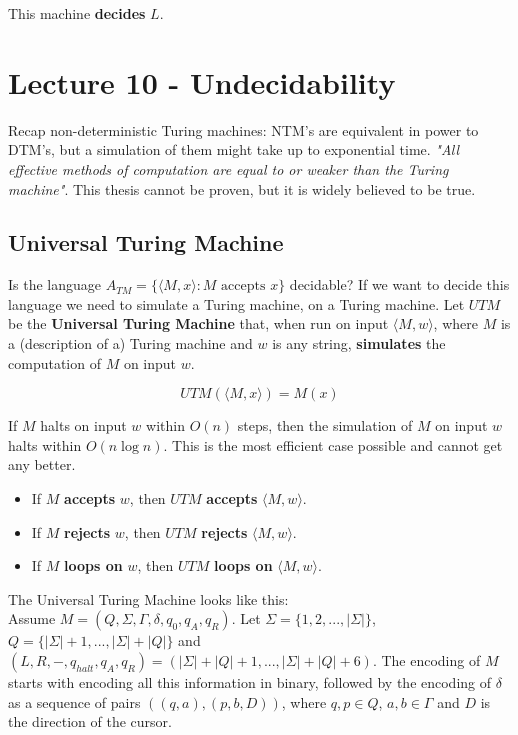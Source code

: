 \documentclass[12pt]{article}
\begin{document}
\noindent
This machine \textbf{decides} $L$.

%
%
\newpage
\section*{Lecture 10 - Undecidability}
Recap non-deterministic Turing machines:
NTM's are equivalent in power to DTM's, but a simulation of them might take up to exponential time.
\textit{"All effective methods of computation are equal to or weaker than the Turing machine"}.
This thesis cannot be proven, but it is widely believed to be true.

\subsection*{Universal Turing Machine}
Is the language $A_{TM} = \{\langle M, x \rangle : M \text{ accepts } x\}$ decidable?
If we want to decide this language we need to simulate a Turing machine, on a Turing machine.
Let $UTM$ be the \textbf{Universal Turing Machine} that, when run on input $\langle M, w \rangle$, where $M$ is a (description of a) Turing machine and $w$ is any string, \textbf{simulates} the computation of $M$ on input $w$.

\[ UTM(\langle M, x \rangle) = M(x) \]

\noindent
If $M$ halts on input $w$ within $O(n)$ steps, then the simulation of $M$ on input $w$ halts within $O(n \log n)$.
This is the most efficient case possible and cannot get any better.

\begin{itemize}
    \item If $M$ \textbf{accepts} $w$, then $UTM$ \textbf{accepts} $\langle M, w \rangle$.
    \item If $M$ \textbf{rejects} $w$, then $UTM$ \textbf{rejects} $\langle M, w \rangle$.
    \item If $M$ \textbf{loops on} $w$, then $UTM$ \textbf{loops on} $\langle M, w \rangle$.
\end{itemize}

\noindent
The Universal Turing Machine looks like this:\\
Assume $M = (Q, \Sigma, \Gamma, \delta, q_0, q_A, q_R)$.
Let $\Sigma = \{1, 2, ... , |\Sigma|\}$, $Q = \{|\Sigma| + 1, ... , |\Sigma| + |Q|\}$ and\\$(L, R, -, q_{halt}, q_A, q_R) = (|\Sigma| + |Q| + 1, ... , |\Sigma| + |Q| + 6)$.
The encoding of $M$ starts with encoding all this information in binary, followed by the encoding of $\delta$ as a sequence of pairs $((q, a), (p, b, D))$, where $q, p \in Q$, $a, b \in \Gamma$ and $D$ is the direction of the cursor.
\end{document}
